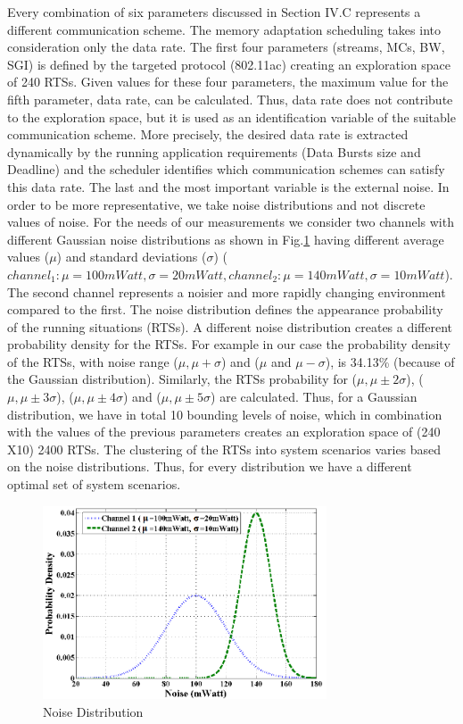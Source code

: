 Every combination of six parameters discussed in Section IV.C represents a different communication scheme. The memory adaptation scheduling takes into consideration only the data rate. The first four parameters (streams, MCs, BW, SGI) is defined by the targeted protocol (802.11ac) \cite{4} creating an exploration space of 240 RTSs. Given values for these four parameters, the maximum value for the fifth parameter, data rate, can be calculated. Thus, data rate does not contribute to the exploration space, but it is used as an identification variable of the suitable communication scheme. More precisely, the desired data rate is extracted dynamically by the running application requirements (Data Bursts size and Deadline) and the scheduler identifies which communication schemes can satisfy this data rate.  
The last and the most important variable is the external noise. In order to be more representative, we take noise distributions and not discrete values of noise.
 For the needs of our measurements we consider two channels with different Gaussian noise distributions as shown in Fig.\ref{fig:F7} having different average values ($\mu$) and standard deviations ($ \sigma $) ($channel_1: \mu  =100mWatt,  \sigma =20mWatt, channel_2:  \mu =140mWatt,  \sigma  = 10mWatt $). 
 The second channel represents a noisier and more rapidly changing environment compared to the first. 
 The noise distribution defines the appearance probability of the running situations (RTSs). 
 A different noise distribution creates a different probability density for the RTSs. For example in our case the probability density of the RTSs, with noise range ($\mu, \mu + \sigma$) and ($\mu$ and $\mu - \sigma$), is 34.13\% (because of the Gaussian distribution). 
 Similarly, the RTSs probability for ($\mu, \mu \pm 2 \sigma$),  ($\mu, \mu \pm 3 \sigma $), ($\mu, \mu \pm 4 \sigma$) and ($\mu, \mu \pm 5 \sigma $) are calculated. 
 Thus, for a Gaussian distribution, we have in total 10 bounding levels of noise, which in combination with the values of the previous parameters creates an exploration space of (240 Χ10) 2400 RTSs. The clustering of the RTSs into system scenarios varies based on the noise distributions. Thus, for every distribution we have a different optimal set of system scenarios.

\begin{figure}
\centering
\includegraphics[width=0.75\textwidth]{F/image11.png}
\caption{Noise Distribution}
\label{fig:F7}
\end{figure}	


